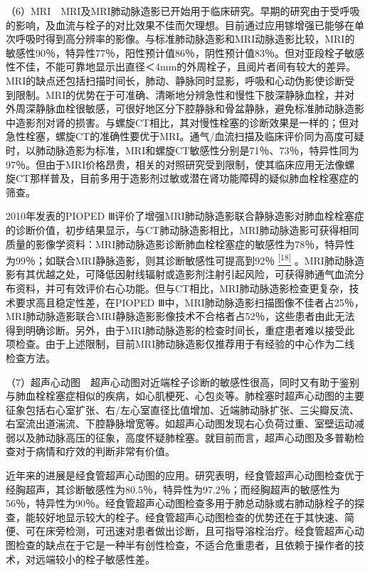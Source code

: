 （6）MRI　MRI及MRI肺动脉造影已开始用于临床研究。早期的研究由于受呼吸的影响，及血流与栓子的对比效果不佳而欠理想。目前通过应用镓增强已能够在单次呼吸时得到高分辨率的影像。与标准肺动脉造影和MRI动脉造影比较，MRI的敏感性90％，特异性77％，阳性预计值86％，阴性预计值83％。但对亚段栓子敏感性不佳，不能可靠地显示出直径＜4mm的外周栓子，且阅片者间有较大的差异。MRI的缺点还包括扫描时间长，肺动、静脉同时显影，呼吸和心动伪影使诊断受到限制。MRI的优势在于可准确、清晰地分辨急性和慢性下肢深静脉血栓，并对外周深静脉血栓很敏感，可很好地区分下腔静脉和骨盆静脉，避免标准肺动脉造影中造影剂对肾的损害。与螺旋CT相比，其对慢性栓塞的诊断效果是一样的；但对急性栓塞，螺旋CT的准确性要优于MRI。通气/血流扫描及临床评价同为高度可疑时，以肺动脉造影为标准，MRI和螺旋CT敏感性分别是71％、73％，特异性同为97％。但由于MRI价格昂贵，相关的对照研究受到限制，使其临床应用无法像螺旋CT那样普及，目前多用于造影剂过敏或潜在肾功能障碍的疑似肺血栓栓塞症的筛查。

2010年发表的PIOPED
Ⅲ评价了增强MRI肺动脉造影联合静脉造影对肺血栓栓塞症的诊断价值，初步结果显示，与CT肺动脉造影相比，MRI肺动脉造影可获得相同质量的影像学资料：MRI肺动脉造影诊断肺血栓栓塞症的敏感性为78％，特异性为99％；如联合MRI静脉造影，则其诊断敏感性可提高到92％
\protect\hyperlink{text00022.htmlux5cux23ch18-21}{\textsuperscript{{[}18{]}}}
。MRI肺动脉造影有其优越之处，可降低因射线辐射或造影剂注射引起风险，可获得肺通气血流分布资料，并可有效评价右心功能。但与CT相比，MRI肺动脉造影检查更复杂，技术要求高且稳定性差，在PIOPED
Ⅲ中，MRI肺动脉造影扫描图像不佳者占25％，MRI肺动脉造影联合MRI静脉造影影像技术不合格者占52％，这些患者由此无法得到明确诊断。另外，由于MRI肺动脉造影的检查时间长，重症患者难以接受此项检查。由于上述限制，目前MRI肺动脉造影仅推荐用于有经验的中心作为二线检查方法。

（7）超声心动图　超声心动图对近端栓子诊断的敏感性很高，同时又有助于鉴别与肺血栓栓塞症相似的疾病，如心肌梗死、心包炎等。肺栓塞时超声心动图的主要征象包括右心室扩张、右/左心室直径比值增加、近端肺动脉扩张、三尖瓣反流、右室流出道湍流、下腔静脉增宽等。如超声心动图发现右心负荷过重、室壁运动减弱以及肺动脉高压的征象，高度怀疑肺栓塞。就目前而言，超声心动图及多普勒检查对于病情和疗效的判断非常有价值。

近年来的进展是经食管超声心动图的应用。研究表明，经食管超声心动图检查优于经胸超声，其诊断敏感性为80.5％，特异性为97.2％；而经胸超声的敏感性为56％，特异性为90％。经食管超声心动图检查多用于肺总动脉或右肺动脉栓子的探查，能较好地显示较大的栓子。经食管超声心动图检查的优势还在于其快速、简便、可在床旁检测，可迅速对患者做出诊断，且可指导溶栓治疗。经食管超声心动图检查的缺点在于它是一种半有创性检查，不适合危重患者，且依赖于操作者的技术，对远端较小的栓子敏感性差。

